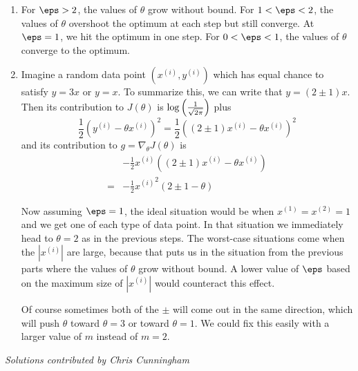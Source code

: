 \documentclass{article}
\begin{document}
\begin{enumerate}
\begin{enumerate}
    \underline{For $\eps = 0.5$}, at each step, $\theta$ is replaced by $\theta - \frac12(\theta - 2) = \frac12\theta + 1$. So starting at $\theta = 4$, the sequence of parameters is $4, 3, 2.5, 2.25, 2.125, \ldots$, slowly converging to the optimum $\theta = 2$. 
    \item For $\eps > 2$, the values of $\theta$ grow without bound. For $1 < \eps < 2$, the values of $\theta$ overshoot the optimum at each step but still converge. At $\eps = 1$, we hit the optimum in one step. For $0 < \eps < 1$, the values of $\theta$ converge to the optimum.
    \item Imagine a random data point $(x^{(i)}, y^{(i)})$ which has equal chance to satisfy $y = 3x$ or $y = x$. To summarize this, we can write that $y = (2\pm1)x$. Then its contribution to $J(\theta)$ is $\log\left(\frac{1}{\sqrt{2\pi}}\right)$ plus 
    \begin{equation*}
        \frac12\left(y^{(i)}-\theta x^{(i)}\right)^2 = \frac12\left((2\pm 1)x^{(i)}-\theta x^{(i)}\right)^2
    \end{equation*}
    and its contribution to $g = \nabla_\theta J(\theta)$ is
    \begin{align*}
          & -\frac12 x^{(i)}     \left((2 \pm 1)x^{(i)} -\theta x^{(i)}\right) \\
        = & -\frac12 {x^{(i)}}^2 \left( 2 \pm 1 - \theta \right)
    \end{align*}
    
    Now assuming $\eps = 1$, the ideal situation would be when $x^{(1)} = x^{(2)} = 1$ and we get one of each type of data point. In that situation we immediately head to $\theta = 2$ as in the previous steps. The worst-case situations come when the $|x^{(i)}|$ are large, because that puts us in the situation from the previous parts where the values of $\theta$ grow without bound. A lower value of $\eps$ based on the maximum size of $|x^{(i)}|$ would counteract this effect.
    
    Of course sometimes both of the $\pm$ will come out in the same direction, which will push $\theta$ toward $\theta = 3$ or toward $\theta = 1$. We could fix this easily with a larger value of $m$ instead of $m = 2$. 

\end{enumerate}

{\em Solutions contributed by Chris Cunningham}

\end{enumerate}
\end{document}
